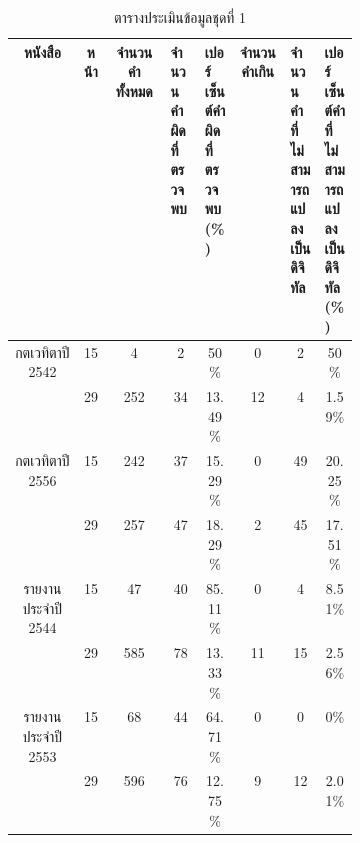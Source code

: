 \begin{table}[H]
    \caption{ตารางประเมินข้อมูลชุดที่ 1}\label{tbl:bigdata}
    \begin{tabular}{|c|c|c|p{0.1\linewidth}|p{0.1\linewidth}|c|p{0.1\linewidth}|p{0.1\linewidth}|}
            \hline
            หนังสือ                             & หน้า  & จำนวนคำทั้งหมด & จำนวนคำผิดที่ตรวจพบ & เปอร์เซ็นต์คำผิดที่ตรวจพบ(\%)    & จำนวนคำเกิน & จำนวนคำที่ไม่สามารถแปลงเป็นดิจิทัล & เปอร์เซ็นต์คำที่ไม่สามารถแปลงเป็นดิจิทัล(\%)    \\ \hline
            \multirow{2}{*}{กตเวทิตาปี 2542}      & 15    & 4         & \multicolumn{1}{c|}{2  }         & \multicolumn{1}{c|}{50\%   } & \multicolumn{1}{c|}{0 }     & \multicolumn{1}{c|}{2  }             & \multicolumn{1}{c|}{50\%   } \\ \cline{2-8} 
                                                & 29    & 252       & \multicolumn{1}{c|}{34 }         & \multicolumn{1}{c|}{13.49\%} & \multicolumn{1}{c|}{12}     & \multicolumn{1}{c|}{4  }             & \multicolumn{1}{c|}{1.59\% } \\ \hline
            \multirow{2}{*}{กตเวทิตาปี 2556}      & 15    & 242       & \multicolumn{1}{c|}{37 }         & \multicolumn{1}{c|}{15.29\%} & \multicolumn{1}{c|}{0 }     & \multicolumn{1}{c|}{49 }             & \multicolumn{1}{c|}{20.25\%} \\ \cline{2-8} 
                                                & 29    & 257       & \multicolumn{1}{c|}{47 }         & \multicolumn{1}{c|}{18.29\%} & \multicolumn{1}{c|}{2 }     & \multicolumn{1}{c|}{45 }             & \multicolumn{1}{c|}{17.51\%} \\ \hline
            \multirow{2}{*}{รายงานประจำปี 2544}   & 15    & 47        & \multicolumn{1}{c|}{40 }         & \multicolumn{1}{c|}{85.11\%} & \multicolumn{1}{c|}{0 }     & \multicolumn{1}{c|}{4  }             & \multicolumn{1}{c|}{8.51\% } \\ \cline{2-8} 
                                                & 29    & 585       & \multicolumn{1}{c|}{78 }         & \multicolumn{1}{c|}{13.33\%} & \multicolumn{1}{c|}{11}     & \multicolumn{1}{c|}{15 }             & \multicolumn{1}{c|}{2.56\% } \\ \hline
            \multirow{2}{*}{รายงานประจำปี 2553}   & 15    & 68        & \multicolumn{1}{c|}{44 }         & \multicolumn{1}{c|}{64.71\%} & \multicolumn{1}{c|}{0 }     & \multicolumn{1}{c|}{0  }             & \multicolumn{1}{c|}{0\%    } \\ \cline{2-8} 
                                                & 29    & 596       & \multicolumn{1}{c|}{76 }         & \multicolumn{1}{c|}{12.75\%} & \multicolumn{1}{c|}{9 }     & \multicolumn{1}{c|}{12 }             & \multicolumn{1}{c|}{2.01\% } \\ \hline

\end{tabular}
\end{table}
